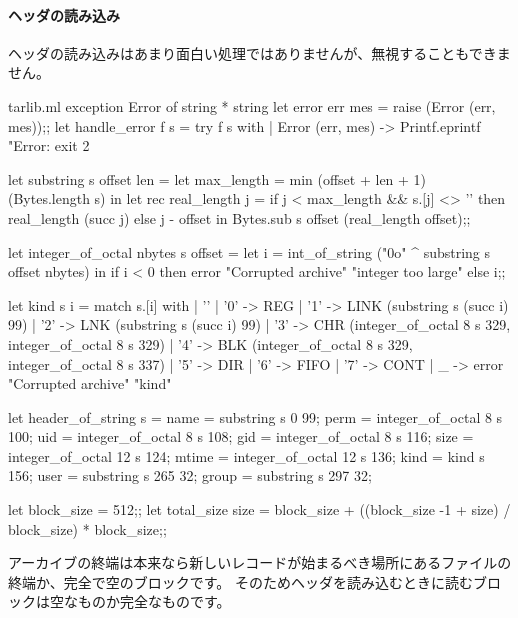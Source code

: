 \paragraph {ヘッダの読み込み}
ヘッダの読み込みはあまり面白い処理ではありませんが、無視することもできません。
%
\begin{listingcodefile}{tarlib.ml}
exception Error of string * string
let error err mes = raise (Error (err, mes));;
let handle_error f s =
  try f s with
  | Error (err, mes) ->
      Printf.eprintf "Error: %
      exit 2

let substring s offset len =
  let max_length = min (offset + len + 1) (Bytes.length s) in
  let rec real_length j =
    if j < max_length && s.[j] <> '' then real_length (succ j)
    else j - offset in
  Bytes.sub s offset (real_length offset);;

let integer_of_octal nbytes s offset =
  let i = int_of_string ("0o" ^ substring s offset nbytes) in
  if i < 0 then error "Corrupted archive" "integer too large" else i;;

let kind s i = match s.[i] with
  | '' | '0' -> REG
  | '1' -> LINK (substring s (succ i) 99)
  | '2' -> LNK (substring s (succ i) 99)
  | '3' -> CHR (integer_of_octal 8 s 329, integer_of_octal 8 s 329)
  | '4' -> BLK (integer_of_octal 8 s 329, integer_of_octal 8 s 337)
  | '5' -> DIR | '6' -> FIFO | '7' -> CONT
  | _ -> error "Corrupted archive" "kind"

let header_of_string s =
  { name = substring s 0 99;
    perm = integer_of_octal 8 s 100;
    uid = integer_of_octal 8 s 108;
    gid = integer_of_octal 8 s 116;
    size = integer_of_octal 12 s 124;
    mtime = integer_of_octal 12 s 136;
    kind = kind s 156;
    user = substring s 265 32;
    group = substring s 297 32; }

let block_size = 512;;
let total_size size =
  block_size + ((block_size -1 + size) / block_size) * block_size;;
\end{listingcodefile}
%
アーカイブの終端は本来なら新しいレコードが始まるべき場所にあるファイルの終端か、完全で空のブロックです。
そのためヘッダを読み込むときに読むブロックは空なものか完全なものです。
